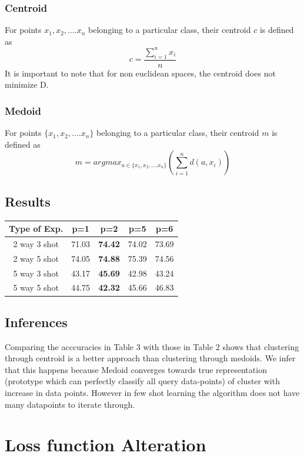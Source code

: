 \subsubsection{Centroid}
For points \( x_1, x_2, ....x_n\) belonging to a particular class, their centroid \(c\) is defined as
\[c = \frac{\sum_{i=1}^n x_i}{n}\]It is important to note that for non euclidean spaces, the centroid does not minimize D.
\subsubsection{Medoid}
For points \(\{ x_1, x_2, ....x_n\}\) belonging to a particular class, their centroid \(m\) is defined as
\[m   = argmax_{a\in\{ x_1, x_2, ....x_n\}}(\sum_{i=1}^{n}d(a, x_i)) \]
\subsection{Results}
\begin{center}
\begin{tabular}{|c |c |c |c|c|}
\hline
Type of Exp. & p=1 & \textbf{p=2} & p=5 & p=6 \\
\hline\hline
2 way 3 shot & 71.03 & \textbf{74.42} & 74.02 &  73.69\\
2 way 5 shot & 74.05 & \textbf{74.88} & 75.39 & 74.56 \\
5 way 3 shot & 43.17 & \textbf{45.69} & 42.98 &  43.24 \\
5 way 5 shot & 44.75 &\textbf{ 42.32} & 45.66 & 46.83  \\
\hline
\end{tabular}
\end{center}
\subsection{Inferences}
Comparing the acccuracies in Table 3 with those in Table 2 shows that clustering through centroid is a better approach than clustering through medoids. We infer that this happens because Medoid converges towards true representation (prototype which can perfectly classify all query data-points) of cluster with increase in data points. However in few shot learning the algorithm does not have many datapoints to iterate through.


\afterpage{\null\newpage}
\section{Loss function Alteration}
